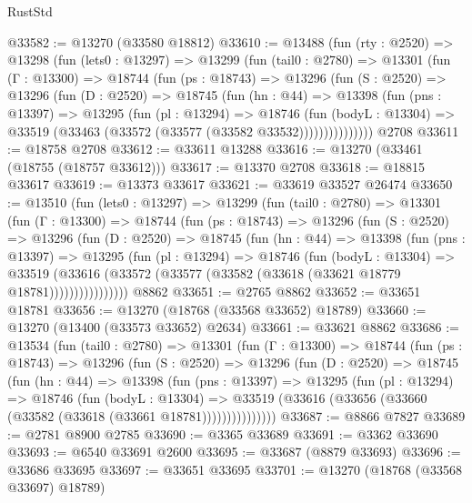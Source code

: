 \begin{lexlean}{RustStd}
\begin{coremodule}
@33582 := @13270 (@33580 @18812)
@33610 := @13488
    (fun (rty : @2520) =>
    @13298
      (fun (lets0 : @13297) =>
      @13299
        (fun (tail0 : @2780) =>
        @13301
          (fun (Γ : @13300) =>
          @18744
            (fun (ps : @18743) =>
            @13296
              (fun (S : @2520) =>
              @13296
                (fun (D : @2520) =>
                @18745
                  (fun (hn : @44) =>
                  @13398
                    (fun (pns : @13397) =>
                    @13295
                      (fun (pl : @13294) =>
                      @18746
                        (fun (bodyL : @13304) =>
                        @33519 (@33463 (@33572 (@33577 (@33582 @33532)))))))))))))))
    @2708
@33611 := @18758 @2708
@33612 := @33611 @13288
@33616 := @13270 (@33461 (@18755 (@18757 @33612)))
@33617 := @13370 @2708
@33618 := @18815 @33617
@33619 := @13373 @33617
@33621 := @33619 @33527 @26474
@33650 := @13510
    (fun (lets0 : @13297) =>
    @13299
      (fun (tail0 : @2780) =>
      @13301
        (fun (Γ : @13300) =>
        @18744
          (fun (ps : @18743) =>
          @13296
            (fun (S : @2520) =>
            @13296
              (fun (D : @2520) =>
              @18745
                (fun (hn : @44) =>
                @13398
                  (fun (pns : @13397) =>
                  @13295
                    (fun (pl : @13294) =>
                    @18746
                      (fun (bodyL : @13304) =>
                      @33519
                        (@33616
                          (@33572 (@33577 (@33582 (@33618 (@33621 @18779 @18781))))))))))))))))
    @8862
@33651 := @2765 @8862
@33652 := @33651 @18781
@33656 := @13270 (@18768 (@33568 @33652) @18789)
@33660 := @13270 (@13400 (@33573 @33652) @2634)
@33661 := @33621 @8862
@33686 := @13534
    (fun (tail0 : @2780) =>
    @13301
      (fun (Γ : @13300) =>
      @18744
        (fun (ps : @18743) =>
        @13296
          (fun (S : @2520) =>
          @13296
            (fun (D : @2520) =>
            @18745
              (fun (hn : @44) =>
              @13398
                (fun (pns : @13397) =>
                @13295
                  (fun (pl : @13294) =>
                  @18746
                    (fun (bodyL : @13304) =>
                    @33519 (@33616 (@33656 (@33660 (@33582 (@33618 (@33661 @18781)))))))))))))))
@33687 := @8866 @7827
@33689 := @2781 @8900 @2785
@33690 := @3365 @33689
@33691 := @3362 @33690
@33693 := @6540 @33691 @2600
@33695 := @33687 (@8879 @33693)
@33696 := @33686 @33695
@33697 := @33651 @33695
@33701 := @13270 (@18768 (@33568 @33697) @18789)

\end{coremodule}
\end{lexlean}
